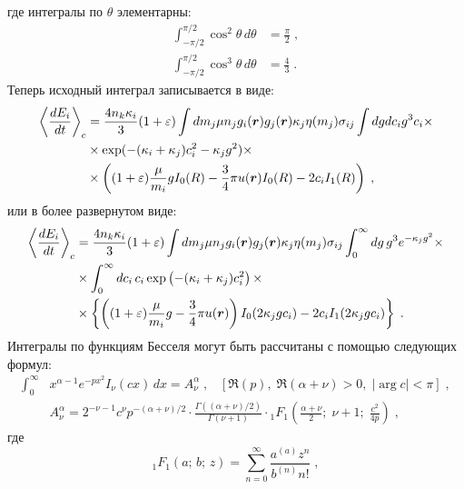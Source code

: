 где интегралы по $\theta$ элементарны:
\begin{equation}
  \begin{split}
    \int_{-\pi/2}^{\pi/2} \cos^2\theta\,d\theta &= \frac{\pi}{2}\;,\\
    \int_{-\pi/2}^{\pi/2} \cos^3\theta\,d\theta &= \frac{4}{3}\;.
  \end{split}
\end{equation}
Теперь исходный интеграл записывается в виде:
\begin{equation}
  \begin{split}
    \left\langle\frac{dE_i}{dt}\right\rangle_c &= \frac{4n_k\kappa_i}{3}(1+\varepsilon)\int dm_j\mu n_jg_i(\bm{r})g_j(\bm{r})\kappa_j\eta(m_j)\sigma_{ij}
    \int dgdc_i g^3c_i\times\\
    &\times\exp(-(\kappa_i+\kappa_j)c^2_i-\kappa_jg^2)\times\\
    &\times\left((1+\varepsilon)\frac{\mu}{m_i}gI_0(R)-\frac{3}{4}\pi u(\bm{r})I_0(R)-2c_iI_1(R)\right)\;,
  \end{split}
\end{equation}
или в более развернутом виде:
\begin{equation}
  \begin{split}
    \left\langle\frac{dE_i}{dt}\right\rangle_c &= \frac{4n_k\kappa_i}{3}(1+\varepsilon)\int dm_j\mu n_jg_i(\bm{r})g_j(\bm{r})\kappa_j\eta(m_j)\sigma_{ij}
    \int_{0}^{\infty}dg\,g^3e^{-\kappa_jg^2}\times\\
    &\times\int_{0}^{\infty}dc_i\,c_i\exp\left(-(\kappa_i+\kappa_j)c^2_i\right)\times\\
    &\times\left\{\left((1+\varepsilon)\frac{\mu}{m_i}g-\frac{3}{4}\pi u(\bm{r})\right)I_0(2\kappa_jgc_i)-2c_iI_1(2\kappa_jgc_i)\right\}\;.
  \end{split}
\end{equation}
Интегралы по функциям Бесселя могут быть рассчитаны с помощью следующих формул:
\begin{equation}
  \begin{split}
    \int_{0}^{\infty}&x^{\alpha-1}e^{-px^2}I_{\nu}(cx)\,dx = A^{\alpha}_{\nu}\;,\;\;\;\left[\Re(p),\;\Re(\alpha+\nu)>0,\;\vert\arg c\vert<\pi\right]\;,\\
    &A^{\alpha}_{\nu}=2^{-\nu-1}c^{\nu}p^{-(\alpha+\nu)/2}\cdot\frac{\Gamma((\alpha+\nu)/2)}{\Gamma(\nu+1)}\cdot
    \mbox{}_{1}F_{1}\left(\frac{\alpha+\nu}{2};\;\nu+1;\;\frac{c^2}{4p}\right)\;,
  \end{split}
\end{equation}
где 
\begin{equation}
  \mbox{}_{1}F_{1}(a;\,b;\,z) = \sum_{n=0}^{\infty}\frac{a^{(a)}z^n}{b^{(n)}n!}\;,
\end{equation}
